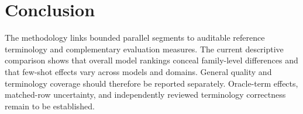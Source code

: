 \section{Conclusion}
\label{sec:conclusion}

The methodology links bounded parallel segments to auditable reference terminology and complementary
evaluation measures. The current descriptive comparison shows that overall model rankings conceal
family-level differences and that few-shot effects vary across models and domains. General quality
and terminology coverage should therefore be reported separately. Oracle-term effects, matched-row
uncertainty, and independently reviewed terminology correctness remain to be established.